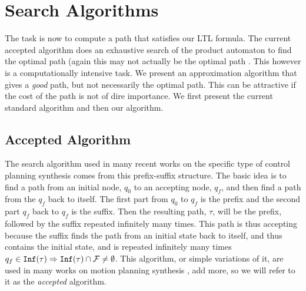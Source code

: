 \chapter{Search Algorithms}
The task is now to compute a path that satisfies our LTL formula. The current accepted algorithm does an exhaustive search of the product automaton to find the optimal path (again this may not actually be the optimal path \cite{schuppan05}. This however is a computationally intensive task. We present an approximation algorithm that gives a \textit{good} path, but not necessarily the optimal path. This can be attractive if the cost of the path is not of dire importance. We first present the current standard algorithm and then our algorithm. 
\section{Accepted Algorithm}
The search algorithm used in many recent works on the specific type of control planning synthesis comes from this prefix-suffix structure. The basic idea is to find a path from an initial node, $q_0$ to an accepting node, $q_f$, and then find a path from the $q_f$ back to itself. The first part from $q_0$ to $q_f$ is the prefix and the second part $q_f$ back to $q_f$ is the suffix. Then the resulting path, $\tau$, will be the prefix, followed by the suffix repeated infinitely many times. This path is thus accepting because the suffix finds the path from an initial state back to itself, and thus contains the initial state, and is repeated infinitely many times $q_f \in \texttt{Inf} (\tau)  \Rightarrow \texttt{Inf} (\tau) \cap \mathcal{F} \neq \emptyset$. This algorithm, or simple variations of it, are used in many works on motion planning synthesis \cite{fainekos09}, add more, so we will refer to it as the \textit{accepted} algorithm. 


